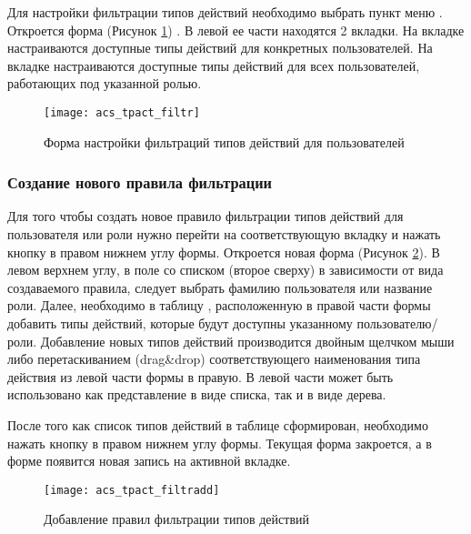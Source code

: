 Для настройки фильтрации типов действий необходимо выбрать пункт меню . Откроется форма (Рисунок \ref{img_acs_tpact_filtr}) . В левой ее части находятся 2 вкладки. На вкладке  настраиваются доступные типы действий для конкретных пользователей. На вкладке  настраиваются доступные типы действий для всех пользователей, работающих под указанной ролью.

\begin{figure}[ht]\centering
 \texttt{[image: acs\_tpact\_filtr]}
 \caption{Форма настройки фильтраций типов действий для пользователей}
 \label{img_acs_tpact_filtr}
\end{figure}

\subsubsection{Создание нового правила фильтрации} \label{acs_tpactfiltr}

Для того чтобы создать новое правило фильтрации типов действий для пользователя или роли нужно перейти на соответствующую вкладку и нажать кнопку  в правом нижнем углу формы. Откроется новая форма  (Рисунок \ref{img_acs_tpact_filtradd}). В левом верхнем углу, в поле со списком (второе сверху) в зависимости от вида создаваемого правила, следует выбрать фамилию пользователя или название роли. Далее, необходимо в таблицу , расположенную в правой части формы добавить типы действий, которые будут доступны указанному пользователю/роли. Добавление новых типов действий производится двойным щелчком мыши либо перетаскиванием (drag\&drop) соответствующего наименования типа действия из левой части формы в правую. В левой части может быть использовано как представление в виде списка, так и в виде дерева.

После того как список типов действий в таблице  сформирован, необходимо нажать кнопку   в правом нижнем углу формы. Текущая форма закроется, а в форме  появится новая запись на активной вкладке.

\begin{figure}[ht]\centering
 \texttt{[image: acs\_tpact\_filtradd]}
 \caption{Добавление правил фильтрации типов действий}
 \label{img_acs_tpact_filtradd}
\end{figure}


